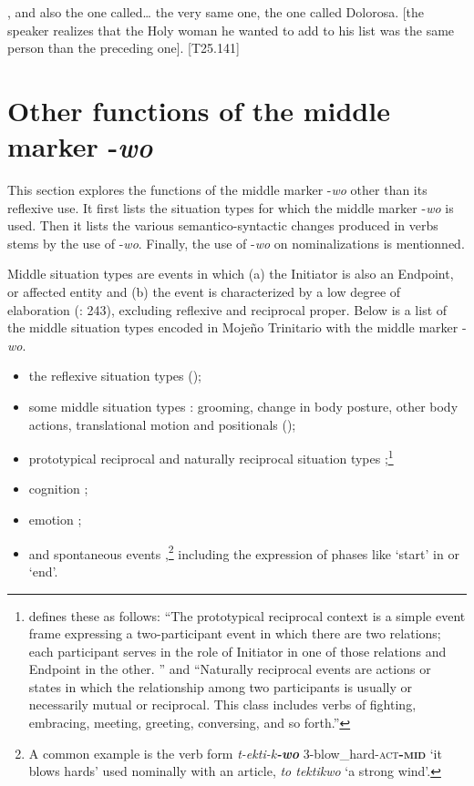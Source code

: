 \documentclass[output=paper]{langscibook}
\begin{document}
, and also the one called… the very same one, the one called Dolorosa. [the speaker realizes that the Holy woman he wanted to add to his list was the same person than the preceding one]. [T25.141]
\z

\section{Other functions of the middle marker -\textit{wo}}
\label{sec:Rose:5}

This section explores the functions of the middle marker -\textit{wo} other than its reflexive use. It first lists the situation types for which the middle marker -\textit{wo} is used. Then it lists the various semantico-syntactic changes produced in verbs stems by the use of -\textit{wo}. Finally, the use of -\textit{wo} on nominalizations is mentionned.



Middle situation types are events in which (a) the Initiator is also an Endpoint, or affected entity and (b) the event is characterized by a low degree of elaboration (\citealt{Kemmer1993}: 243), excluding reflexive and reciprocal proper. Below is a list of the middle situation types encoded in Mojeño Trinitario with the middle marker -\textit{wo}.


\begin{itemize}
\item the reflexive situation types ();

\item some middle situation types : grooming, change in body posture, other body actions, translational motion and positionals ();

\item prototypical reciprocal  and naturally reciprocal situation types ;\footnote{\citet[17; 96--97]{Kemmer1993} defines these as follows: “The prototypical reciprocal context is a simple event frame expressing a two-participant event in which there are two relations; each participant serves in the role of Initiator in one of those relations and Endpoint in the other. ” and “Naturally reciprocal events are actions or states in which the relationship among two participants is usually or necessarily mutual or reciprocal. This class includes verbs of fighting, embracing, meeting, greeting, conversing, and so forth.”}

\item cognition ;

\item emotion ;

\item and spontaneous events ,\footnote{A common example is the verb form \textit{t-ekti-k}\textbf{\textit{-wo}} 3-blow\_hard-\textsc{act\textbf{-mid}} ‘it blows hards’ used nominally with an article, \textit{to tektikwo} ‘a strong wind’.} including the expression of phases like ‘start’ in  or ‘end’.

\end{itemize}
\end{document}
